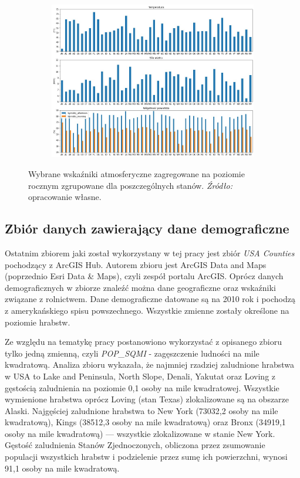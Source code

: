 \documentclass[polish, twoside, 12pt, a4paper]{article}
\theoremstyle{definition}
\theoremstyle{plain}
\theoremstyle{remark}
\begin{document}
\begin{figure}[H]
  \centering
  \begin{subfigure}[t]{\textwidth}
    \includegraphics[width=15cm]{atm-all.jpg}
  \end{subfigure}
  \captionsetup{margin=10pt,font=small,labelfont=bf,width=.8\textwidth}
  \caption{Wybrane wskaźniki atmosferyczne zagregowane na poziomie rocznym zgrupowane dla poszczególnych stanów. \textit{Źródło:} opracowanie własne.}\label{fig:figure:xx4}
\end{figure}

\subsection{Zbiór danych zawierający dane demograficzne}

Ostatnim zbiorem jaki został wykorzystany w tej pracy jest zbiór \emph{USA Counties} pochodzący z ArcGIS Hub. Autorem zbioru jest ArcGIS Data and Maps (poprzednio Esri Data \& Maps), czyli zespół portalu ArcGIS. Oprócz danych demograficznych w zbiorze znaleźć można dane geograficzne oraz wskaźniki związane z rolnictwem. Dane demograficzne datowane są na 2010 rok i pochodzą z amerykańskiego spisu powszechnego. Wszystkie zmienne zostały określone na poziomie hrabstw.

Ze względu na tematykę pracy postanowiono wykorzystać z opisanego zbioru tylko jedną zmienną, czyli \emph{POP\_SQMI} - zagęszczenie ludności na mile kwadratową. Analiza zbioru wykazała, że najmniej rzadziej zaludnione hrabstwa w USA to Lake and Peninsula, North Slope, Denali, Yakutat oraz Loving z gęstością zaludnienia na poziomie 0,1 osoby na mile kwadratowej. Wszystkie wymienione hrabstwa oprócz Loving (stan Texas) zlokalizowane są na obszarze Alaski. Najgęściej zaludnione hrabstwa to New York (73032,2 osoby na mile kwadratową), Kings (38512,3 osoby na mile kwadratową) oraz Bronx (34919,1 osoby na mile kwadratową) --- wszystkie zlokalizowane w stanie New York. Gęstość zaludnienia Stanów Zjednoczonych, obliczona przez zsumowanie populacji wszystkich hrabstw i podzielenie przez sumę ich powierzchni, wynosi 91,1 osoby na mile kwadratową.
\end{document}
